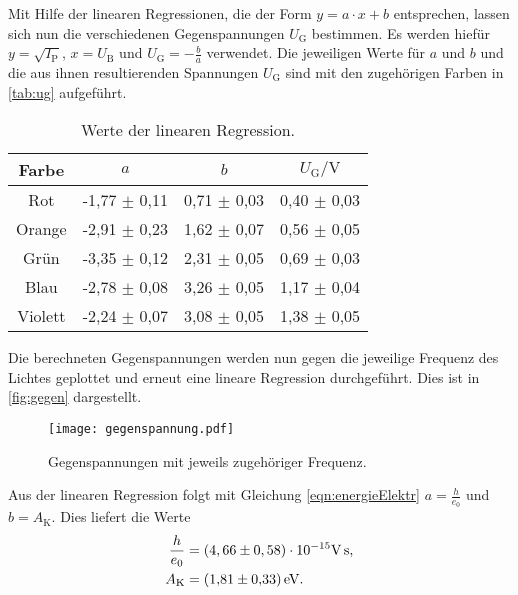 \noindent
Mit Hilfe der linearen Regressionen, die der Form $y=a \cdot x+b$ entsprechen, lassen sich nun die verschiedenen Gegenspannungen $U_\text{G}$ bestimmen. Es werden hiefür
$y=\sqrt{I_\text{P}}$, $x=U_\text{B}$ und $U_\text{G}=-\frac{b}{a}$ verwendet. Die jeweiligen Werte für $a$ und $b$ und die aus ihnen resultierenden Spannungen
$U_\text{G}$ sind mit den zugehörigen Farben in \autoref{tab:ug} aufgeführt.

\begin{table}[H]
  \centering
  \begin{tabular}{c c c c}
      \toprule
      Farbe & $a$ & $b$ & $U_\text{G} / \si{\volt}$\\
      \midrule
      Rot &  -1,77 $\pm$ 0,11 & 0,71 $\pm$ 0,03 & 0,40 $\pm$ 0,03 \\
      Orange &  -2,91 $\pm$ 0,23 & 1,62 $\pm$ 0,07 & 0,56 $\pm$ 0,05 \\
      Grün & -3,35 $\pm$ 0,12 & 2,31 $\pm$ 0,05 & 0,69 $\pm$ 0,03 \\
      Blau &  -2,78 $\pm$ 0,08 & 3,26 $\pm$ 0,05 & 1,17 $\pm$ 0,04 \\
      Violett &  -2,24 $\pm$ 0,07 & 3,08 $\pm$ 0,05 & 1,38 $\pm$ 0,05 \\
      \bottomrule
  \end{tabular}
  \caption{Werte der linearen Regression.}
  \label{tab:ug}
\end{table}

\noindent
Die berechneten Gegenspannungen werden nun gegen die jeweilige Frequenz des Lichtes geplottet und erneut eine lineare Regression durchgeführt. Dies ist in \autoref{fig:gegen} dargestellt.

\begin{figure}[H]
  \centering
  \texttt{[image: gegenspannung.pdf]}
  \caption{Gegenspannungen mit jeweils zugehöriger Frequenz.}
  \label{fig:gegen}
\end{figure}

\noindent
Aus der linearen Regression folgt mit Gleichung \eqref{eqn:energieElektr} $a=\frac{h}{e_0}$ und $b=A_\text{K}$. Dies liefert die Werte
\begin{align*}
  \frac{h}{e_0} &= (4,66 \pm 0,58) \cdot 10^{-15} \si{\volt\second}, \\
  A_\text{K} &= \SI{1,81 \pm 0,33}{\electronvolt}.
\end{align*}

